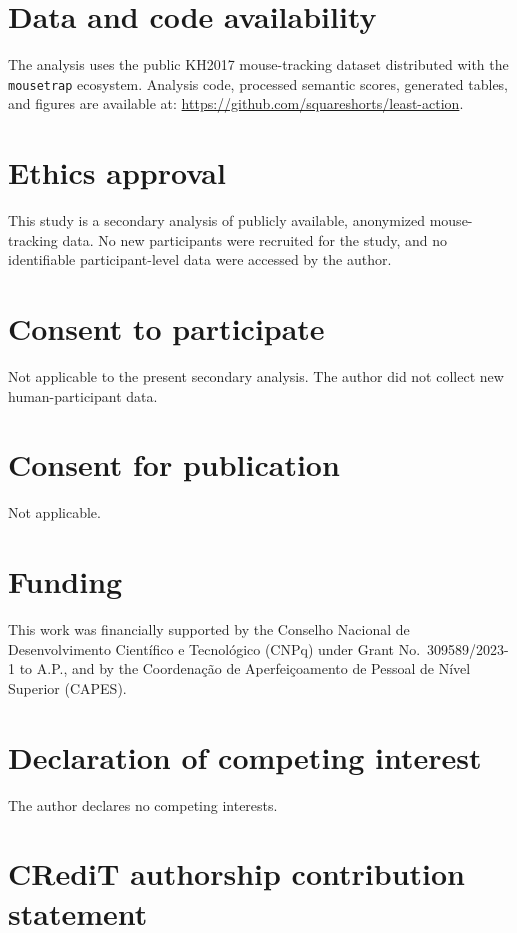 \documentclass[11pt,final]{article}
\begin{document}
\section*{Data and code availability}

The analysis uses the public KH2017 mouse-tracking dataset distributed with the \texttt{mousetrap} ecosystem. Analysis code, processed semantic scores, generated tables, and figures are available at: \url{https://github.com/squareshorts/least-action}.

\section*{Ethics approval}

This study is a secondary analysis of publicly available, anonymized mouse-tracking data. No new participants were recruited for the study, and no identifiable participant-level data were accessed by the author.

\section*{Consent to participate}

Not applicable to the present secondary analysis. The author did not collect new human-participant data.

\section*{Consent for publication}

Not applicable.

\section*{Funding}

This work was financially supported by the Conselho Nacional de Desenvolvimento Científico e Tecnológico (CNPq) under Grant No.~309589/2023-1 to A.P., and by the Coordenação de Aperfeiçoamento de Pessoal de Nível Superior (CAPES).

\section*{Declaration of competing interest}

The author declares no competing interests.

\section*{CRediT authorship contribution statement}
\end{document}
